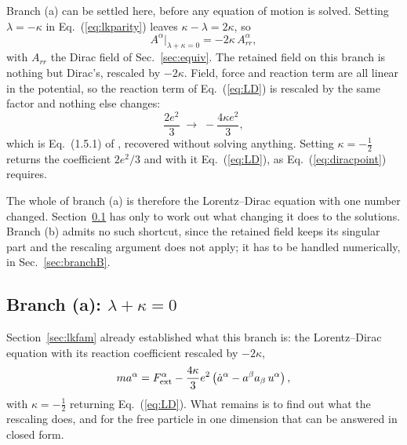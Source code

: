 \documentclass[preprint]{aastex701}
\newcommand{\Fext}{F^\alpha_{\rm ext}}
\begin{document}
Branch (a) can be settled here, before any equation of motion is solved.
Setting $\lambda=-\kappa$ in Eq.~(\ref{eq:lkparity}) leaves
$\kappa - \lambda = 2\kappa$, so
\begin{equation}
A^\alpha\big|_{\lambda+\kappa=0} = -2\kappa\,A^\alpha_{rr},
\label{eq:branchArescale}
\end{equation}
with $A_{rr}$ the Dirac field of Sec.~\ref{sec:equiv}. The retained field on
this branch is nothing but Dirac's, rescaled by $-2\kappa$. Field, force and
reaction term are all linear in the potential, so the reaction term of
Eq.~(\ref{eq:LD}) is rescaled by the same factor and nothing else changes:
\begin{equation}
\frac{2e^2}{3} \;\longrightarrow\; -\frac{4\kappa e^2}{3},
\label{eq:coeffrescale}
\end{equation}
which is Eq.~(1.5.1) of \citet{zhang2006}, recovered without solving anything.
Setting $\kappa=-\tfrac12$ returns the coefficient $2e^2/3$ and with it
Eq.~(\ref{eq:LD}), as Eq.~(\ref{eq:diracpoint}) requires.

The whole of branch (a) is therefore the Lorentz--Dirac equation with one
number changed. Section~\ref{sec:branchA} has only to work out what changing it
does to the solutions. Branch (b) admits no such shortcut, since the retained
field keeps its singular part and the rescaling argument does not apply; it has
to be handled numerically, in Sec.~\ref{sec:branchB}.

\subsection{Branch (a): $\lambda+\kappa=0$}
\label{sec:branchA}



Section~\ref{sec:lkfam} already established what this branch is: the
Lorentz--Dirac equation with its reaction coefficient rescaled by $-2\kappa$,
\begin{equation}
ma^\alpha = \Fext - \frac{4\kappa}{3}e^2
\left(\dot a^\alpha - a^\beta a_\beta\,u^\alpha\right),
\label{eq:151}
\end{equation}
with $\kappa=-\tfrac12$ returning Eq.~(\ref{eq:LD}). What remains is to find out
what the rescaling does, and for the free particle in one dimension that can be
answered in closed form.
\end{document}
